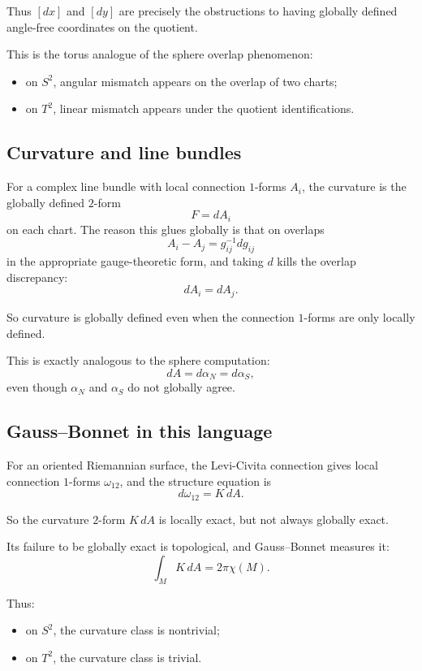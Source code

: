 \documentclass[11pt]{article}
\begin{document}
	Thus \([dx]\) and \([dy]\) are precisely the obstructions to having globally defined angle-free coordinates on the quotient.
	
	This is the torus analogue of the sphere overlap phenomenon:
	\begin{itemize}
		\item on \(S^2\), angular mismatch appears on the overlap of two charts;
		\item on \(T^2\), linear mismatch appears under the quotient identifications.
	\end{itemize}
	
	\subsection*{Curvature and line bundles}
	
	For a complex line bundle with local connection \(1\)-forms \(A_i\), the curvature is the globally defined \(2\)-form
	\[
	F=dA_i
	\]
	on each chart. The reason this glues globally is that on overlaps
	\[
	A_i-A_j = g_{ij}^{-1}dg_{ij}
	\]
	in the appropriate gauge-theoretic form, and taking \(d\) kills the overlap discrepancy:
	\[
	dA_i=dA_j.
	\]
	
	So curvature is globally defined even when the connection \(1\)-forms are only locally defined.
	
	This is exactly analogous to the sphere computation:
	\[
	dA=d\alpha_N=d\alpha_S,
	\]
	even though \(\alpha_N\) and \(\alpha_S\) do not globally agree.
	
	\subsection*{Gauss--Bonnet in this language}
	
	For an oriented Riemannian surface, the Levi-Civita connection gives local connection \(1\)-forms \(\omega_{12}\), and the structure equation is
	\[
	d\omega_{12}=K\,dA.
	\]
	
	So the curvature \(2\)-form \(K\,dA\) is locally exact, but not always globally exact.
	
	Its failure to be globally exact is topological, and Gauss--Bonnet measures it:
	\[
	\int_M K\,dA = 2\pi\chi(M).
	\]
	
	Thus:
	\begin{itemize}
		\item on \(S^2\), the curvature class is nontrivial;
		\item on \(T^2\), the curvature class is trivial.
	\end{itemize}
	
\end{document}
